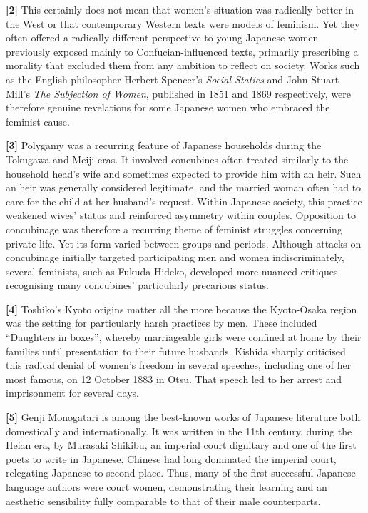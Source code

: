 \documentclass[11pt,a4paper]{article}
\begin{document}
\textbf{{[}2{]}} This certainly does not mean that women's situation was radically better in the West or that contemporary Western texts were models of feminism. Yet they often offered a radically different perspective to young Japanese women previously exposed mainly to Confucian-influenced texts, primarily prescribing a morality that excluded them from any ambition to reflect on society. Works such as the English philosopher Herbert Spencer's \emph{Social Statics} and John Stuart Mill's \emph{The Subjection of Women}, published in 1851 and 1869 respectively, were therefore genuine revelations for some Japanese women who embraced the feminist cause.

\textbf{{[}3{]}} Polygamy was a recurring feature of Japanese households during the Tokugawa and Meiji eras. It involved concubines often treated similarly to the household head's wife and sometimes expected to provide him with an heir. Such an heir was generally considered legitimate, and the married woman often had to care for the child at her husband's request. Within Japanese society, this practice weakened wives' status and reinforced asymmetry within couples. Opposition to concubinage was therefore a recurring theme of feminist struggles concerning private life. Yet its form varied between groups and periods. Although attacks on concubinage initially targeted participating men and women indiscriminately, several feminists, such as Fukuda Hideko, developed more nuanced critiques recognising many concubines' particularly precarious status.

\textbf{{[}4{]}} Toshiko's Kyoto origins matter all the more because the Kyoto-Osaka region was the setting for particularly harsh practices by men. These included ``Daughters in boxes'', whereby marriageable girls were confined at home by their families until presentation to their future husbands. Kishida sharply criticised this radical denial of women's freedom in several speeches, including one of her most famous, on 12 October 1883 in Otsu. That speech led to her arrest and imprisonment for several days.

\textbf{{[}5{]}} Genji Monogatari is among the best-known works of Japanese literature both domestically and internationally. It was written in the 11th century, during the Heian era, by Murasaki Shikibu, an imperial court dignitary and one of the first poets to write in Japanese. Chinese had long dominated the imperial court, relegating Japanese to second place. Thus, many of the first successful Japanese-language authors were court women, demonstrating their learning and an aesthetic sensibility fully comparable to that of their male counterparts.
\end{document}
